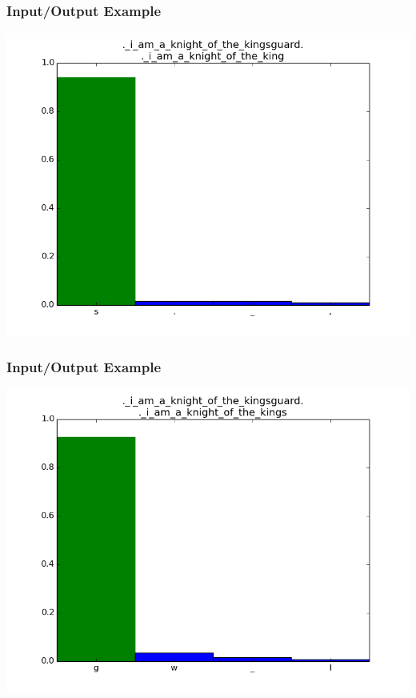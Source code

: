 \documentclass[12]{beamer}
\begin{document}
\begin{frame}
\frametitle{Input/Output Example}
\begin{center}
\includegraphics[scale=0.4]{../distplot/26.png}
\end{center}
\end{frame}

\begin{frame}
\frametitle{Input/Output Example}
\begin{center}
\includegraphics[scale=0.4]{../distplot/27.png}
\end{center}
\end{frame}
\end{document}
